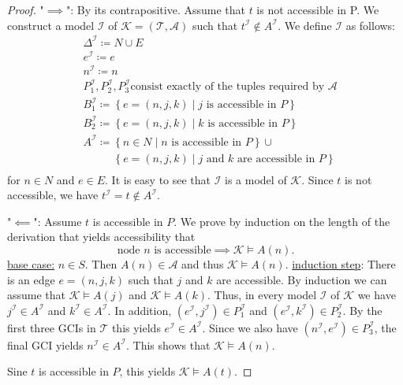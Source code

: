 \begin{proof}
	"$\implies$": By its contrapositive.
	Assume that $t$ is not accessible in P.
	We construct a model $\mathcal{I}$ of $\mathcal{K} = (\mathcal{T}, \mathcal{A})$
	such that $t^{\mathcal{I}} \notin A^{\mathcal{I}}$.
	We define $\mathcal{I}$ as follows:
	\begin{align*}
		&\Delta^{\mathcal{I}} \coloneqq N \cup E\\
		&e^{\mathcal{I}} \coloneqq e\\
		&n^{\mathcal{I}} \coloneqq n\\
		&P_1^{\mathcal{I}}, P_2^{\mathcal{I}}, P_3^{\mathcal{I}} \text{consist exactly of the tuples required by $\mathcal{A}$}\\
		&B_1^{\mathcal{I}} \coloneqq \left\{ e = (n,j,k) \mid j \text{ is accessible in } P \right\}\\
		&B_2^{\mathcal{I}} \coloneqq \left\{ e = (n,j,k) \mid k \text{ is accessible in } P \right\}\\
		&A^{\mathcal{I}} \coloneqq \left\{ n \in N \mid n \text{ is accessible in } P \right\} \cup\\
		&\;\;\,\qquad \left\{ e = (n,j,k) \mid j \text{ and } k \text{ are accessible in } P \right\}\\
	\end{align*}
	for $n \in N$ and $e \in E$.
	It is easy to see that $\mathcal{I}$ is a model of $\mathcal{K}$.
	Since $t$ is not accessible, we have $t^{\mathcal{I}} = t \notin A^{\mathcal{I}}$.

	"$\impliedby$":
	Assume $t$ is accessible in $P$.
	We prove by induction on the length of the derivation that yields accessibility that
	\[
		\text{node $n$ is accessible} \implies \mathcal{K} \vDash A(n)
	.\]
	\underline{base case:} $n \in S$.
	Then $A(n) \in \mathcal{A}$ and thus $\mathcal{K} \vDash A(n)$.
	\newline
	\underline{induction step}: There is an edge $e=(n, j, k)$ such that $j$ and $k$ are accessible.
	By induction we can assume that $\mathcal{K} \vDash A(j)$ and $\mathcal{K} \vDash A(k)$.
	Thus, in every model $\mathcal{I}$ of $\mathcal{K}$ we have $j^{\mathcal{I}} \in A^{\mathcal{I}}$ and $k^\mathcal{I} \in A^{\mathcal{I}}$.
	In addition, $\left( e^{\mathcal{I}}, j^{\mathcal{I}} \right) \in P_1^\mathcal{I}$ 
	and $\left( e^{\mathcal{I}}, k^{\mathcal{I}} \right) \in P_2^\mathcal{I}$.
	By the first three GCIs in $\mathcal{T}$ this yields $e^{\mathcal{I}} \in A^\mathcal{I}$.
	Since we also have $\left( n^{\mathcal{I}}, e^{\mathcal{I}} \right) \in P_3^\mathcal{I}$,
	the final GCI yields $n^{\mathcal{I}} \in A^{\mathcal{I}}$.
	This shows that $\mathcal{K} \vDash A(n)$.

	Sine $t$ is accessible in $P$, this yields $\mathcal{K} \vDash A(t)$.
\end{proof}

